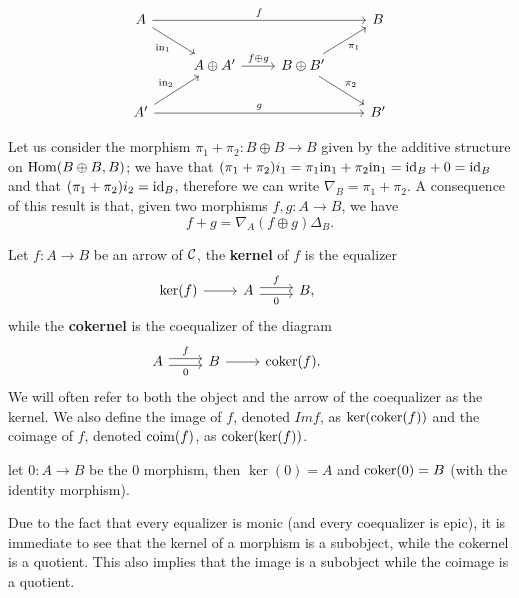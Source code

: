 \[\begin{tikzcd}
	A && {} & B \\
	& {A\oplus A'} & {B\oplus B'} \\
	{A'} &&& {B'}
	\arrow["f", from=1-1, to=1-4]
	\arrow["{\inn_1}"', from=1-1, to=2-2]
	\arrow["{f\oplus g}", from=2-2, to=2-3]
	\arrow["{\pi_1}"', from=2-3, to=1-4]
	\arrow["{\pi_2}", from=2-3, to=3-4]
	\arrow["{\inn_2}", from=3-1, to=2-2]
	\arrow["g", from=3-1, to=3-4]
\end{tikzcd}\]




\begin{remark}
	Let us consider the morphism $\pi_1+\pi_2\colon B\oplus B \longrightarrow B$ given by the additive structure on $\mathrm{Hom}(B\oplus B, B)$; we have that $(\pi_1 +\pi_2)i_1 = \pi_1 \mathrm{in}_1 + \pi_2 \mathrm{in}_1 = \mathrm{id}_B + 0 =\mathrm{id}_B $ and that $(\pi_1 +\pi_2)i_2 =\mathrm{id}_B $, therefore we can write $\nabla_B = \pi_1+\pi_2$. A consequence of this result is that, given two morphisms $f,g \colon A \longrightarrow B$, we have
	\[f+g = \nabla_A (f \oplus g) \Delta_B.\]
\end{remark}

\begin{definition}
	Let $f : A\longrightarrow B$ be an arrow of $\mathcal{C}$, the \textbf{kernel} of $f$ is the equalizer 
	\[\begin{tikzcd}
	\ker(f) & A & B, & {}
	\arrow["0"', shift right=1, from=1-2, to=1-3]
	\arrow["f", shift left=1, from=1-2, to=1-3]
	\arrow[from=1-1, to=1-2]
	\end{tikzcd}\]
	while the \textbf{cokernel} is the coequalizer of the diagram
	\[\begin{tikzcd}
	 A & B & \coker(f). & {}
	\arrow["0"', shift right=1, from=1-1, to=1-2]
	\arrow["f", shift left=1, from=1-1, to=1-2]
	\arrow[from=1-2, to=1-3]
	\end{tikzcd}\]
	We will often refer to both the object and the arrow of the coequalizer as the kernel. We also define the image of $f$, denoted $Im f$, as $\ker(\operatorname{coker}(f))$ and the coimage of $f$, denoted $\operatorname{coim}(f)$, as $\operatorname{coker}(\ker(f))$.

\end{definition}

\begin{example}
	let $0\colon A \longrightarrow B$ be the $0$ morphism, then $\ker(0) = A$ and $\operatorname{coker}(0) = B$ (with the identity morphism).
\end{example}


\begin{remark}
	Due to the fact that every equalizer is monic (and every coequalizer is epic), it is immediate to see that the kernel of a morphism is a subobject, while the cokernel is a quotient. This also implies that the image is a subobject while the coimage is a quotient.
\end{remark}

